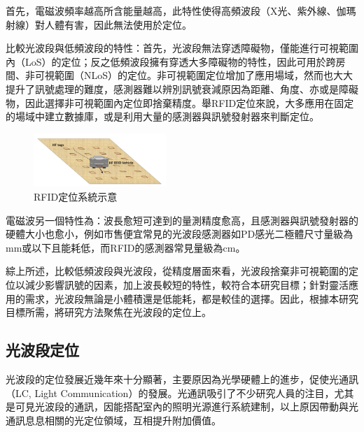         首先，電磁波頻率越高所含能量越高，此特性使得高頻波段（X光、紫外線、伽瑪射線）對人體有害，因此無法使用於定位。
        
        比較光波段與低頻波段的特性：首先，光波段無法穿透障礙物，僅能進行可視範圍內（LoS）的定位；反之低頻波段擁有穿透大多障礙物的特性，因此可用於跨房間、非可視範圍（NLoS）的定位\cite{survey_indoor2018}。非可視範圍定位增加了應用場域，然而也大大提升了訊號處理的難度，感測器難以辨別訊號衰減原因為距離、角度、亦或是障礙物，因此選擇非可視範圍內定位即捨棄精度。舉RFID定位來說，大多應用在固定的場域中建立數據庫，或是利用大量的感測器與訊號發射器來判斷定位\cite{survey_rfid}。

        \begin{figure}[ht]
            \centering
            \includegraphics[width=5cm]{ch2pic/rfid_system.png}
            \caption{RFID定位系統示意\cite{survey_rfid}}
            \label{pic:rfid_system}
        \end{figure}

        電磁波另一個特性為：波長愈短可達到的量測精度愈高，且感測器與訊號發射器的硬體大小也愈小，例如市售便宜常見的光波段感測器如PD感光二極體尺寸量級為mm或以下\cite{datasheet:led_sfh4545}且能耗低，而RFID的感測器常見量級為cm\cite{datasheet:rfid_tag}。

        \hspace*{\fill}

        綜上所述，比較低頻波段與光波段，從精度層面來看，光波段捨棄非可視範圍的定位以減少影響訊號的因素，加上波長較短的特性，較符合本研究目標；針對靈活應用的需求，光波段無論是小體積還是低能耗，都是較佳的選擇。因此，根據本研究目標所需，將研究方法聚焦在光波段的定位上。


    \subsection{光波段定位}

        
        光波段的定位發展近幾年來十分顯著，主要原因為光學硬體上的進步，促使光通訊（LC, Light Communication）的發展。光通訊吸引了不少研究人員的注目，尤其是可見光波段的通訊，因能搭配室內的照明光源進行系統建制，以上原因帶動與光通訊息息相關的光定位領域，互相提升附加價值。

        \hspace*{\fill}

